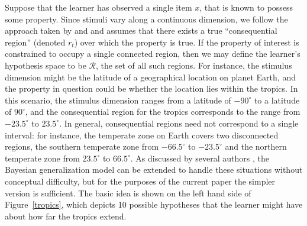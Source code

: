 \documentclass[doc]{apa6}
\newcommand{\rt}{{r_t}}
\begin{document}
Suppose that the learner has observed a single item $x$, that is known to possess some property. Since stimuli vary along a continuous dimension, we follow the approach taken by  and  and assumes that there exists a true ``consequential region'' (denoted $\rt$) over which the property is true. If the property of interest is constrained to occupy a single connected region, then we may define the learner's hypothesis space to be $\mathcal{R}$, the set of all such regions. For instance, the stimulus dimension might be the latitude of a geographical location on planet Earth, and the property in question could be whether the location lies within the tropics. In this scenario, the stimulus dimension ranges from a latitude of $-90^\circ$ to a latitude of $90^\circ$, and the consequential region for the tropics corresponds to the range from $-23.5^\circ$ to $23.5^\circ$. In general, consequential regions need not correspond to a single interval: for instance, the temperate zone on Earth covers two disconnected regions, the southern temperate zone from $-66.5^\circ$ to $-23.5^\circ$ and the northern temperate zone from $23.5^\circ$ to $66.5^\circ$. As discussed by several authors \cite{Shepard1987,Tenenbaum2001a,Navarro2006}, the Bayesian generalization model can be extended to handle these situations without conceptual difficulty, but for the purposes of the current paper the simpler version is sufficient. The basic idea is shown on the left hand side of Figure~\ref{tropics}, which depicts 10 possible hypotheses that the learner might have about how far the tropics extend.
\end{document}
